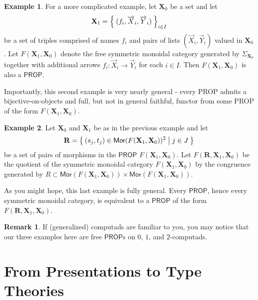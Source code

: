 \documentclass[pra,floatfix,
amsmath,superscriptaddress, 12pt]{article}
\theoremstyle{definition}
\newtheorem*{remark}{Remark}
\newtheorem*{example}{Example}
\newcommand{\msf}[1]{\mathsf{#1}}
\begin{document}
\begin{example} For a more complicated example, let $\mathbf{X}_0$ be a set and let
\[
    \mathbf{X}_1
    =
    \Set{(f_i,\overrightarrow{X}_i,\overrightarrow{Y}_i)}_{i\in I}
\]
be a set of triples comprised of names $f_i$ and pairs of lists $(\overrightarrow{X}_i,\overrightarrow{Y}_i)$ valued in $\mathbf{X}_0$. Let $F(\mathbf{X}_1,\mathbf{X}_0)$ denote the free symmetric monoidal category generated by $\Sigma_{\mathbf{X}_0}$ together with additional arrows $f_{i}:\overrightarrow{X}_i \longrightarrow \overrightarrow{Y}_i$ for each $i\in I$. Then $F(\mathbf{X}_1,\mathbf{X}_0)$ is also a $\msf{PROP}$.

\end{example}

Importantly, this second example is very nearly general - every \textsf{PROP} admits a bijective-on-objects and full, but not in general faithful, functor from some \textsf{PROP} of the form $F(\mathbf{X}_1,\mathbf{X}_0)$.

\begin{example}
 Let  $\mathbf{X}_0$ and $\mathbf{X}_1$ be as in the previous example and let
 \[
    \mathbf{R}=\Set{ (s_j,t_j) \in \mathsf{Mor}(F(\mathbf{X}_1,\mathbf{X}_0))^2 | j \in J}
 \]
 be a set of pairs of morphisms in the $\mathsf{PROP}$ $F(\mathbf{X}_1,\mathbf{X}_0)$. Let $F(\mathbf{R},\mathbf{X}_1,\mathbf{X}_0)$ be the quotient of the symmetric monoidal category $F(\mathbf{X}_1,\mathbf{X}_0)$ by the congruence generated by $R \subset \mathsf{Mor}(F(\mathbf{X}_1,\mathbf{X}_0)) \times \mathsf{Mor}(F(\mathbf{X}_1,\mathbf{X}_0))$.
\end{example}

As you might hope, this last example is fully general. Every $\mathsf{PROP}$, hence every symmetric monoidal category, is equivalent to a $\mathsf{PROP}$ of the form $F(\mathbf{R},\mathbf{X}_1,\mathbf{X}_0)$.

\begin{remark} If (generalized) computads are familiar to you, you may notice that our three examples here are free $\mathsf{PROP}$s on $0$, $1$, and $2$-computads.
\end{remark}

\section{From Presentations to Type Theories}
\end{document}
